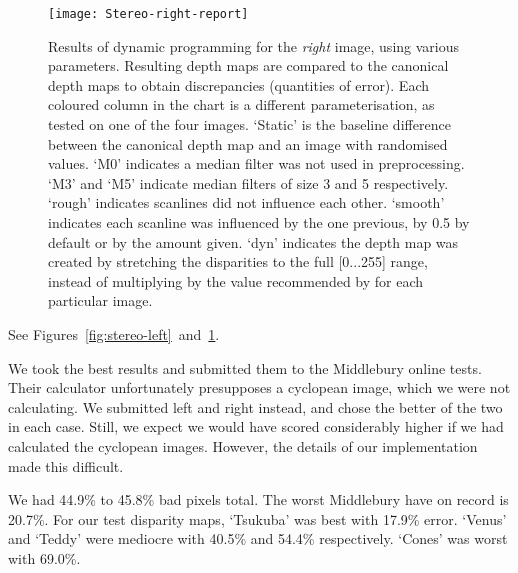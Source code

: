 \begin{figure}[h]
  \centering
  \texttt{[image: Stereo-right-report]}
  \caption[Results of dynamic programming (left image)]{Results of dynamic
    programming for the \emph{right} image, using various parameters. Resulting
    depth maps are compared to the canonical depth maps to obtain discrepancies
    (quantities of error). Each coloured column in the chart is a different
    parameterisation, as tested on one of the four images. `Static' is the
    baseline difference between the canonical depth map and an image with
    randomised values. `M0' indicates a median filter was not used in
    preprocessing. `M3' and `M5' indicate median filters of size 3 and 5
    respectively. `rough' indicates scanlines did not influence each other.
    `smooth' indicates each scanline was influenced by the one previous, by 0.5
    by default or by the amount given. `dyn' indicates the depth map was created
    by stretching the disparities to the full [0...255] range, instead of
    multiplying by the value recommended by \cite{middlebury} for each particular image.}
  \label{fig:stereo-right}
\end{figure}

See Figures~\ref{fig:stereo-left}~and~\ref{fig:stereo-right}.

We took the best results and submitted them to the Middlebury online tests. \cite{stereocorrespondence, middlebury} Their calculator unfortunately presupposes a cyclopean image, which we were not calculating. We submitted left and right instead, and chose the better of the two in each case. Still, we expect we would have scored considerably higher if we had calculated the cyclopean images. However, the details of our implementation made this difficult.

We had 44.9\% to 45.8\% bad pixels total. The worst Middlebury have on record is 20.7\%. \cite{stereocorrespondence, middlebury} For our test disparity maps, `Tsukuba' was best with 17.9\% error. `Venus' and `Teddy' were mediocre with 40.5\% and 54.4\% respectively. `Cones' was worst with 69.0\%.

